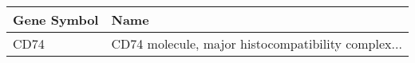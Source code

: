 \begin{tabular}{ll}
\toprule
Gene Symbol &                                               Name \\
\midrule
       CD74 & CD74 molecule, major histocompatibility complex... \\
\bottomrule
\end{tabular}

